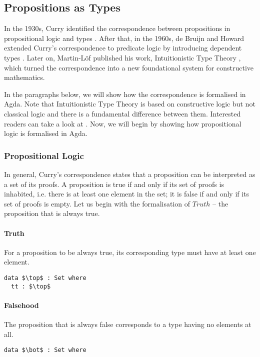 \subsection{Propositions as Types}
\par In the 1930s, Curry identified the
correspondence between propositions in propositional logic and types
\cite{curry1934}. After that, in the 1960s, de Bruijn and Howard extended
Curry's correspondence to predicate logic by introducing dependent
types \cite{bruijn1968, howard1969}. Later on, Martin-L\"of published
his work, Intuitionistic Type Theory \cite{martin1984}, which turned the correspondence into a new
foundational system for constructive mathematics. 

\par In the paragraphs below, we will show how the correspondence is
formalised in Agda. Note that Intuitionistic Type
Theory is based on constructive logic but not classical logic and there
is a fundamental difference between them. Interested readers can take a look at
\cite{avigad2000}. Now, we will begin by showing how propositional
logic is formalised in Agda. 

\subsubsection{Propositional Logic} 
\par In general, Curry's correspondence
states that a proposition can be interpreted as a set of its proofs. A
proposition is true if and only if its set of proofs is inhabited,
i.e. there is at least one element in the set; it is false if and only
if its set of proofs is empty. Let us begin with the formalisation of
\(Truth\) -- the proposition that is always true. 

\paragraph{Truth} For a proposition to be always true, its
corresponding type must have at least one element. 
\begin{lstlisting}[mathescape=true,xleftmargin=.3\textwidth]
data $\top$ : Set where
  tt : $\top$
\end{lstlisting} 

\paragraph{Falsehood} The proposition that is always
false corresponds to a type having no elements at all. 
\begin{lstlisting}[mathescape=true,xleftmargin=.3\textwidth]
data $\bot$ : Set where
\end{lstlisting} 

